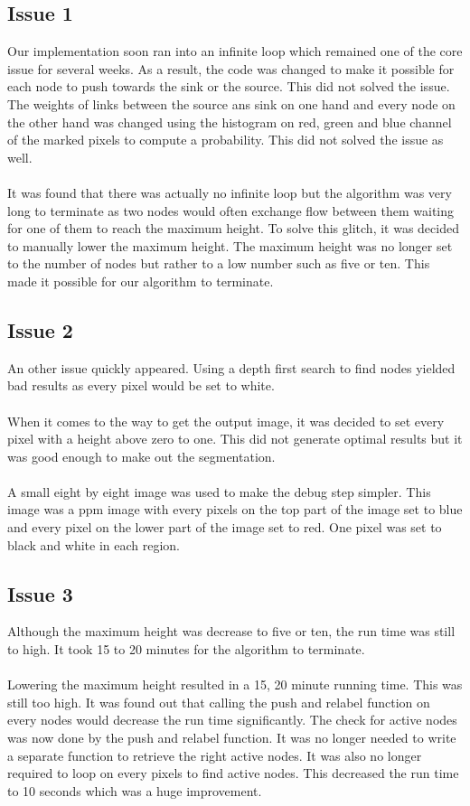 \documentclass{article}
\begin{document}
\subsection{Issue 1}

Our implementation soon ran into an infinite loop which remained one of the core issue for several weeks. As a result, the code was changed to make it possible for each node to push towards the sink or the source. This did not solved the issue. The weights of links between the source ans sink on one hand and every node on the other hand was changed using the histogram on red, green and blue channel of the marked pixels to compute a probability. This did not solved the issue as well.\\
\\
It was found that there was actually no infinite loop but the algorithm was very long to terminate as two nodes would often exchange flow between them waiting for one of them to reach the maximum height. To solve this glitch, it was decided to manually lower the maximum height. The maximum height was no longer set to the number of nodes but rather to a low number such as five or ten. This made it possible for our algorithm to terminate.

\subsection{Issue 2}

An other issue quickly appeared. Using a depth first search to find nodes yielded bad results as every pixel would be set to white.\\
\\
When it comes to the way to get the output image, it was decided to set every pixel with a height above zero to one. This did not generate optimal results but it was good enough to make out the segmentation.\\
\\
A small eight by eight image was used to make the debug step simpler. This image was a ppm image with every pixels on the top part of the image set to blue and every pixel on the lower part of the image set to red. One pixel was set to black and white in each region.

\subsection{Issue 3}

Although the maximum height was decrease to five or ten, the run time was still to high. It took 15 to 20 minutes for the algorithm to terminate.\\
\\
Lowering the maximum height resulted in a 15, 20 minute running time. This was still too high. It was found out that calling the push and relabel function on every nodes would decrease the run time significantly. The check for active nodes was now done by the push and relabel function. It was no longer needed to write a separate function to retrieve the right active nodes. It was also no longer required to loop on every pixels to find active nodes. This decreased the run time to 10 seconds which was a huge improvement.
\end{document}
